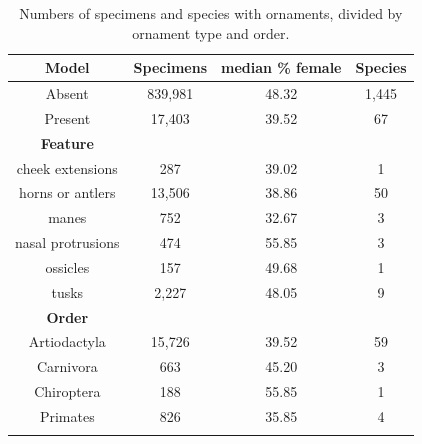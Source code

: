 \documentclass[a4paper, 12pt]{article}
\begin{document}
\begin{table}[H]
\begin{tabular}{cccc}
 
  \hline
  \textbf{Model} & \textbf{Specimens} & \textbf{median \% female} & \textbf{Species}\\ 
  \hline
  Absent & 839,981 & 48.32 & 1,445\\
  Present & 17,403 & 39.52 & 67\\
  \hline
  \textbf{Feature} &&&\\
  \hline
  cheek extensions & 287 & 39.02 & 1\\
  horns or antlers & 13,506 & 38.86 & 50\\
  manes & 752 & 32.67 & 3\\
  nasal protrusions & 474 & 55.85 & 3\\
  ossicles & 157 & 49.68 & 1\\
  tusks & 2,227 & 48.05 & 9\\
  \hline
  \textbf{Order} &&&\\
  \hline
  Artiodactyla & 15,726 & 39.52 & 59\\
  Carnivora & 663 & 45.20 & 3\\
  Chiroptera & 188 & 55.85 & 1\\
  Primates & 826 & 35.85 & 4\\
  \hline

\label{table_orn_numbers}
\end{tabular}
\caption{Numbers of specimens and species with ornaments, divided by ornament type and order.} 
\end{table}

\newpage


\end{document}
